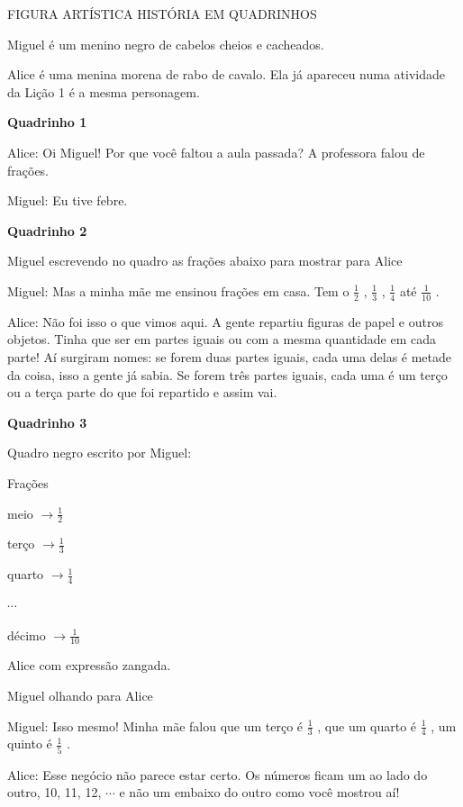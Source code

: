 \documentclass[a4,12pt]{book}
\newcounter{atividade}
\begin{document}
\begin{imagem*}[breakable]{}{}   FIGURA ARTÍSTICA  
  HISTÓRIA EM QUADRINHOS  
  
  Miguel é um menino negro de cabelos cheios e cacheados.  
  
  Alice é uma menina morena de rabo de cavalo. Ela já apareceu numa atividade da Lição 1 é a mesma personagem.  
  
  {\bf Quadrinho 1}  
  
  Alice: Oi Miguel! Por que você faltou a aula passada? A professora falou de frações.  
  
  Miguel: Eu tive febre.   
  
  {\bf Quadrinho 2}  
  
  Miguel escrevendo no quadro as frações abaixo para mostrar para Alice  
  
  Miguel: Mas a minha mãe me ensinou frações em casa. Tem o   $\frac{1}{2}$  ,   $\frac{1}{3}$  ,   $\frac{1}{4}$   até   $\frac{1}{10}$  .  
  
  Alice: Não foi isso o que vimos aqui. A gente repartiu figuras de papel e outros objetos. Tinha que ser em partes iguais ou com a mesma quantidade em cada parte! Aí surgiram nomes: se forem duas partes iguais, cada uma delas é metade da coisa, isso a gente já sabia. Se forem três partes iguais, cada uma é um terço ou a terça parte do que foi repartido e assim vai.  
  
  {\bf Quadrinho 3}  
  
  Quadro negro escrito por Miguel:  
  
  Frações  
  
  meio   $\longrightarrow \frac{1}{2}$     
  
  terço   $\longrightarrow \frac{1}{3}$  
  
  quarto   $\longrightarrow \frac{1}{4}$  
  
  $\cdots$  
  
  décimo   $\longrightarrow \frac{1}{10}$  
  
  Alice com expressão zangada.  
  
  Miguel olhando para Alice  
  
  Miguel: Isso mesmo! Minha mãe falou que um terço é   $\frac{1}{3}$  , que um quarto é   $\frac{1}{4}$  , um quinto é   $\frac{1}{5}$  .  
  
  Alice: Esse negócio não parece estar certo. Os números ficam um ao lado do outro, 10, 11, 12,   $\cdots$   e não um embaixo do outro como você mostrou aí!  
  

\end{imagem*}
\end{document}
